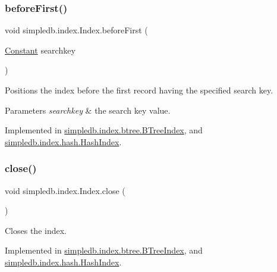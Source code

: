 \subsubsection{\texorpdfstring{before\+First()}{beforeFirst()}}
{\footnotesize\ttfamily void simpledb.\+index.\+Index.\+before\+First (\begin{DoxyParamCaption}\item[{\hyperlink{classsimpledb_1_1query_1_1Constant}{Constant}}]{searchkey }\end{DoxyParamCaption})}

Positions the index before the first record having the specified search key. 
\begin{DoxyParams}{Parameters}
{\em searchkey} & the search key value. \\
\hline
\end{DoxyParams}


Implemented in \hyperlink{classsimpledb_1_1index_1_1btree_1_1BTreeIndex_adaca869455d2d631df38e7bc81de2420}{simpledb.\+index.\+btree.\+B\+Tree\+Index}, and \hyperlink{classsimpledb_1_1index_1_1hash_1_1HashIndex_a23b60680c25ec3ba70d92e5fde16f059}{simpledb.\+index.\+hash.\+Hash\+Index}.

\mbox{\label{interfacesimpledb_1_1index_1_1Index_aedde7a12ff7788c1dc00ef9404b4266e}} 
\subsubsection{\texorpdfstring{close()}{close()}}
{\footnotesize\ttfamily void simpledb.\+index.\+Index.\+close (\begin{DoxyParamCaption}{ }\end{DoxyParamCaption})}

Closes the index. 

Implemented in \hyperlink{classsimpledb_1_1index_1_1btree_1_1BTreeIndex_a057aed52a768423734720f07bf0db94b}{simpledb.\+index.\+btree.\+B\+Tree\+Index}, and \hyperlink{classsimpledb_1_1index_1_1hash_1_1HashIndex_abc28a52b702d34572280aa10c20f1f43}{simpledb.\+index.\+hash.\+Hash\+Index}.

\mbox{\label{interfacesimpledb_1_1index_1_1Index_a3bbe4098bf5422023391ce24f2e7df88}} 
